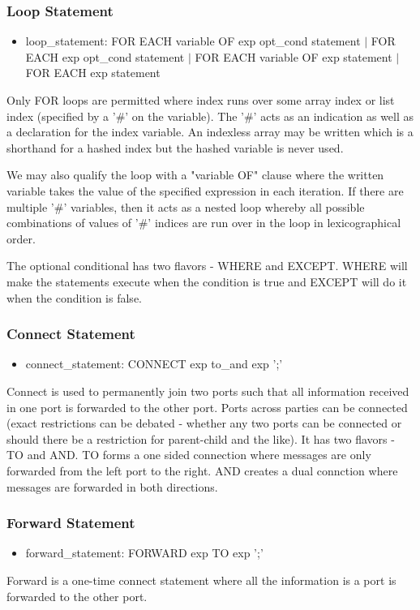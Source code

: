 \subsubsection{Loop Statement}
\begin{itemize}
\item loop\_statement: FOR EACH variable OF exp opt\_cond statement $|$ FOR EACH exp opt\_cond statement
$|$ FOR EACH variable OF exp statement $|$ FOR EACH exp statement
\end{itemize}

Only FOR loops are permitted where index runs over some array index or list index (specified by a '\#' on the variable). The '\#' acts as an indication as well as a declaration for the index variable. An indexless array may be written which is a shorthand for a hashed index but the hashed variable is never used.

We may also qualify the loop with a "variable OF" clause where the written variable takes the value of the specified expression in each iteration. If there are multiple '\#' variables, then it acts as a nested loop whereby all possible combinations of values of '\#' indices are run over in the loop in lexicographical order.

The optional conditional has two flavors - WHERE and EXCEPT. WHERE will make the statements execute when the condition is true and EXCEPT will do it when the condition is false.

\subsubsection{Connect Statement}
\begin{itemize}
\item connect\_statement: CONNECT exp to\_and exp ';'
\end{itemize}

Connect is used to permanently join two ports such that all information received in one port is forwarded to the other port. Ports across parties can be connected (exact restrictions can be debated - whether any two ports can be connected or should there be a restriction for parent-child and the like). It has two flavors - TO and AND. TO forms a one sided connection where messages are only forwarded from the left port to the right. AND creates a dual connction where messages are forwarded in both directions.


\subsubsection{Forward Statement}
\begin{itemize}
\item forward\_statement: FORWARD exp TO exp ';'
\end{itemize}

Forward is a one-time connect statement where all the information is a port is forwarded to the other port.


